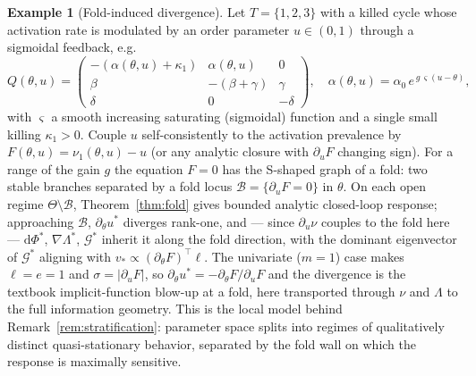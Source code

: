 \documentclass[11pt,reqno]{amsart}
\theoremstyle{plain}
\theoremstyle{definition}
\newtheorem{example}[theorem]{Example}
\theoremstyle{remark}
\newcommand{\dd}{\mathrm{d}}
\begin{document}
\begin{example}[Fold-induced divergence]\label{ex:fold}
Let $T=\{1,2,3\}$ with a killed cycle whose activation rate is modulated by an
order parameter $u\in(0,1)$ through a sigmoidal feedback, e.g.
\[
Q(\theta,u)=
\begin{pmatrix}
-(\alpha(\theta,u)+\kappa_1) & \alpha(\theta,u) & 0\\
\beta & -(\beta+\gamma) & \gamma\\
\delta & 0 & -\delta
\end{pmatrix},
\quad
\alpha(\theta,u)=\alpha_0\,e^{\,g\,\varsigma(u-\theta)},
\]
with $\varsigma$ a smooth increasing saturating (sigmoidal) function and a single
small killing $\kappa_1>0$. Couple $u$ self-consistently to the activation prevalence by
$F(\theta,u)=\nu_1(\theta,u)-u$ \textup{(}or any analytic closure with
$\partial_uF$ changing sign\textup{)}. For a range of the gain $g$ the equation
$F=0$ has the S-shaped graph of a fold: two stable branches separated by a fold
locus $\mathcal B=\{\partial_uF=0\}$ in $\theta$. On each open regime
$\Theta\setminus\mathcal B$, Theorem~\ref{thm:fold} gives bounded analytic
closed-loop response; approaching $\mathcal B$, $\partial_\theta u^{*}$ diverges
rank-one, and --- since $\partial_u\nu$ couples to the fold here ---
$\dd\Phi^{*}$, $\nabla\Lambda^{*}$, $\mathcal G^{*}$ inherit it along the fold
direction, with the dominant eigenvector of $\mathcal G^{*}$ aligning with
$v_{*}\propto(\partial_\theta F)^{\top}\ell$. The univariate ($m=1$) case makes
$\ell=e=1$ and $\sigma=|\partial_uF|$, so $\partial_\theta u^{*}=-\partial_\theta
F/\partial_uF$ and the divergence is the textbook implicit-function blow-up at a
fold, here transported through $\nu$ and $\Lambda$ to the full information geometry.
This is the local model behind Remark~\ref{rem:stratification}: parameter space splits
into regimes of qualitatively distinct quasi-stationary behavior, separated by the
fold wall on which the response is maximally sensitive.


\end{example}
\end{document}
